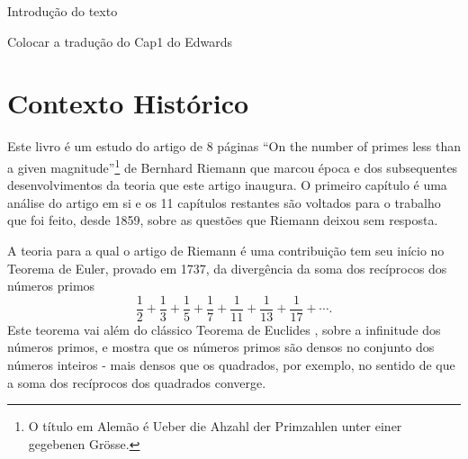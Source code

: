 Introdução do texto

Colocar a tradução do Cap1 do Edwards

    \section*{Contexto Histórico}

    Este livro é um estudo do artigo de 8 páginas ``On the number of primes less than a given magnitude''\footnote{O título em Alemão é Ueber die Ahzahl der Primzahlen unter einer gegebenen Gr\"osse.} de Bernhard Riemann que marcou época e dos subsequentes desenvolvimentos da teoria que este artigo inaugura. O primeiro capítulo é uma análise do artigo em si e os 11 capítulos restantes são voltados para o trabalho que foi feito, desde 1859, sobre as questões que Riemann deixou sem resposta.

    A teoria para a qual o artigo de Riemann é uma contribuição tem seu início no Teorema de Euler, provado em 1737, da divergência da soma dos recíprocos dos números primos
    \begin{equation}
    \label{Soma-Recip-primos}
    \frac{1}{2} + \frac{1}{3} + \frac{1}{5} + \frac{1}{7} + \frac{1}{11} + \frac{1}{13} + \frac{1}{17} + \cdots.
    \end{equation}
    Este teorema vai além do clássico 
    Teorema de Euclides \cite{MR1932864}, sobre a infinitude 
    dos números primos, e mostra que os números primos 
    são densos no conjunto dos números inteiros - 
    mais densos que os quadrados, por exemplo, 
    no sentido de que a soma dos recíprocos dos quadrados converge.
    
